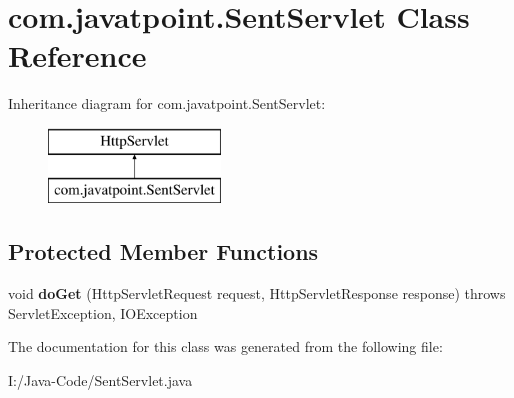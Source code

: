 \hypertarget{classcom_1_1javatpoint_1_1_sent_servlet}{}\section{com.\+javatpoint.\+Sent\+Servlet Class Reference}
\label{classcom_1_1javatpoint_1_1_sent_servlet}
Inheritance diagram for com.\+javatpoint.\+Sent\+Servlet\+:\begin{figure}[H]
\begin{center}
\leavevmode
\includegraphics[height=2.000000cm]{classcom_1_1javatpoint_1_1_sent_servlet}
\end{center}
\end{figure}
\subsection*{Protected Member Functions}
\begin{DoxyCompactItemize}
\item 
\mbox{\label{classcom_1_1javatpoint_1_1_sent_servlet_a9ba65fc513afb35db7a5e4877a34a246}} 
void {\bfseries do\+Get} (Http\+Servlet\+Request request, Http\+Servlet\+Response response)  throws Servlet\+Exception, I\+O\+Exception 
\end{DoxyCompactItemize}


The documentation for this class was generated from the following file\+:\begin{DoxyCompactItemize}
\item 
I\+:/\+Java-\/\+Code/Sent\+Servlet.\+java\end{DoxyCompactItemize}
